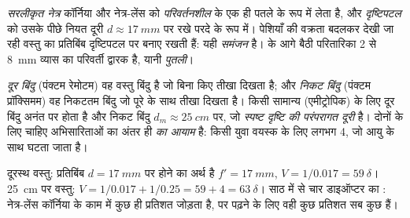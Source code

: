 \begin{definition}[सरलीकृत नेत्र]\label{def:b1:optical-instruments:eye}
\emph{सरलीकृत नेत्र} कॉर्निया और नेत्र-लेंस को \emph{परिवर्तनशील}  के
एक ही पतले  के रूप में लेता है, और \emph{दृष्टिपटल} को उसके पीछे
नियत दूरी $d \approx \qty{17}{mm}$ पर रखे परदे के रूप में। पेशियाँ  की
वक्रता बदलकर देखी जा रही वस्तु का प्रतिबिंब दृष्टिपटल पर बनाए रखती हैं: यही
\emph{समंजन} है।  के आगे बैठी परितारिका \qty{2}{} से
\qty{8}{mm} व्यास का परिवर्ती द्वारक है, यानी \emph{पुतली}।
\end{definition}

\begin{definition}[दूर बिंदु, निकट बिंदु]\label{def:b1:optical-instruments:punctum}
\emph{दूर बिंदु} (पंक्टम रेमोटम) वह वस्तु बिंदु है जो बिना  किए तीखा
दिखता है; और \emph{निकट बिंदु} (पंक्टम प्रॉक्सिमम) वह निकटतम बिंदु जो पूरे
 के साथ तीखा दिखता है। किसी सामान्य (एमीट्रोपिक)  के लिए दूर बिंदु
अनंत पर होता है और निकट बिंदु
$d_m \approx \qty{25}{cm}$ पर, जो \emph{स्पष्ट दृष्टि की परंपरागत दूरी} है।
दोनों के लिए चाहिए अभिसारिताओं का अंतर ही \emph{ का आयाम} है: किसी युवा
वयस्क के लिए लगभग \qty{4}{\delta}, जो आयु के साथ घटता जाता है।
\end{definition}

\begin{example}[नेत्र की अभिसारिता]\label{ex:b1:optical-instruments:vergence}
दूरस्थ वस्तु: प्रतिबिंब $d = \qty{17}{mm}$ पर होने का अर्थ है $f' = \qty{17}{mm}$,
$V = 1/0.017 = \qty{59}{\delta}$। \qty{25}{cm} पर वस्तु:
$V = 1/0.017 + 1/0.25 = 59 + 4 = \qty{63}{\delta}$। साठ में से चार डाइऑप्टर
का : नेत्र-लेंस कॉर्निया के काम में कुछ ही प्रतिशत जोड़ता है, पर पढ़ने के
लिए वही कुछ प्रतिशत सब कुछ हैं।
\end{example}

